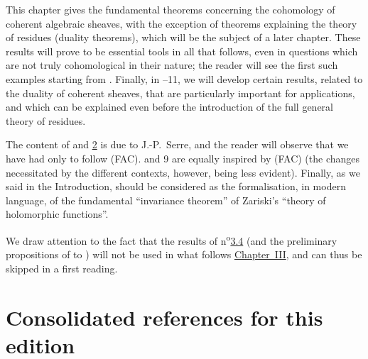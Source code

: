This chapter gives the fundamental theorems concerning the cohomology of coherent algebraic sheaves, with the exception of theorems explaining the theory of residues (duality theorems), which will be the subject of a later chapter.
These results will prove to be essential tools in all that follows, even in questions which are not truly cohomological in their nature;
the reader will see the first such examples starting from \hyperref[section:III.4]{}.
Finally, in \textsection{}--11, we will develop certain results, related to the duality of coherent sheaves, that are particularly important for applications, and which can be explained even before the introduction of the full general theory of residues.

The content of \textsection\hyperref[section:III.1]{} and \hyperref[section:III.2]{2} is due to J.-P.~Serre, and the reader will observe that we have had only to follow (FAC).
 and 9 are equally inspired by (FAC) (the changes necessitated by the different contexts, however, being less evident).
Finally, as we said in the Introduction, \hyperref[section:III.4]{} should be considered as the formalisation, in modern language, of the fundamental ``invariance theorem'' of Zariski's ``theory of holomorphic functions''.

We draw attention to the fact that the results of n\textsuperscript{o}\hyperref[subsection:III.3.4]{3.4} (and the preliminary propositions of  to ) will not be used in what follows \hyperref[section:ega3]{Chapter~III}, and can thus be skipped in a first reading.
\bigskip







\clearpage
{}
{}
\section*{Consolidated references for this edition}




